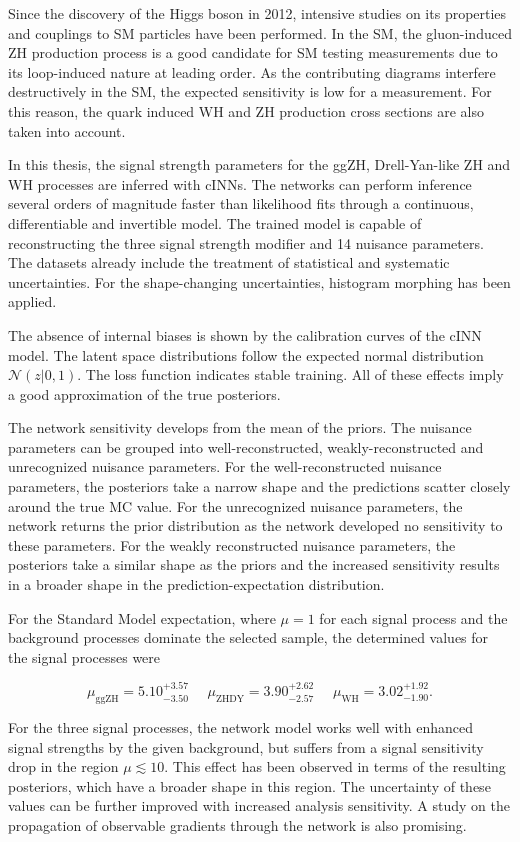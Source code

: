 \label{sec:conclusion}

Since the discovery of the Higgs boson in 2012, intensive studies on its properties and couplings to SM particles have been performed. In the SM, the gluon-induced ZH production process is a good candidate for SM testing measurements due to its loop-induced nature at leading order. As the contributing diagrams interfere destructively in the SM, the expected sensitivity is low for a measurement. For this reason, the quark induced WH and ZH production cross sections are also taken into account.

In this thesis, the signal strength parameters for the ggZH, Drell-Yan-like ZH and WH processes are inferred with cINNs. The networks can perform inference several orders of magnitude faster than likelihood fits through a continuous, differentiable and invertible model. The trained model is capable of reconstructing the three signal strength modifier and 14 nuisance parameters. The datasets already include the treatment of statistical and systematic uncertainties. For the shape-changing uncertainties, histogram morphing has been applied.

The absence of internal biases is shown by the calibration curves of the cINN model. The latent space distributions follow the expected normal distribution $\mathcal{N}(z | 0,1)$. The loss function indicates stable training. All of these effects imply a good approximation of the true posteriors.

The network sensitivity develops from the mean of the priors. The nuisance parameters can be grouped into well-reconstructed, weakly-reconstructed and unrecognized nuisance parameters. For the well-reconstructed nuisance parameters, the posteriors take a narrow shape and the predictions scatter closely around the true MC value. For the unrecognized nuisance parameters, the network returns the prior distribution as the network developed no sensitivity to these parameters. For the weakly reconstructed nuisance parameters, the posteriors take a similar shape as the priors and the increased sensitivity results in a broader shape in the prediction-expectation distribution.

For the Standard Model expectation, where $\mu=1$ for each signal process and the background processes dominate the selected sample, the determined values for the signal processes were

\begin{equation*}
	\mu_\text{ggZH} = 5.10^{+3.57}_{-3.50} \, \, \quad \mu_\text{ZHDY} = 3.90^{+2.62}_{-2.57} \, \, \quad \mu_\text{WH} = 3.02^{+1.92}_{-1.90}.
\end{equation*}

For the three signal processes, the network model works well with enhanced signal strengths by the given background, but suffers from a signal sensitivity drop in the region $\mu\lesssim10$. This effect has been observed in terms of the resulting posteriors, which have a broader shape in this region. The uncertainty of these values can be further improved with increased analysis sensitivity. A study on the propagation of observable gradients through the network is also promising.